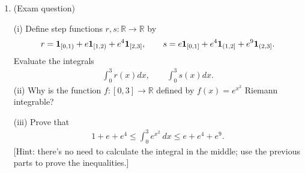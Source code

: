 \documentclass[letterpaper,10pt,english]{jupyterBook}
\begin{document}
\label{\detokenize{Problems:id68}}\begin{enumerate}
%
\setcounter{enumi}{67}
\item {} 
\sphinxAtStartPar
(Exam question)

\sphinxAtStartPar
(i) Define step functions \(r,s\colon \mathbb{R} \rightarrow \mathbb{R}\) by
\begin{equation*}
\begin{split}
    r = {\bf{1}}_{[0,1)} + e {\bf{1}}_{[1,2)} + e^4 {\bf{1}}_{[2,3]}, \qquad  s = e {\bf{1}}_{[0,1]} + e^4 {\bf{1}}_{(1,2]} + e^9 {\bf{1}}_{(2,3]}.
    \end{split}
\end{equation*}
\sphinxAtStartPar
Evaluate the integrals
\begin{equation*}
\begin{split}
    \int_0^3 r(x)dx, \qquad \int_0^3 s(x)dx.
    \end{split}
\end{equation*}
\sphinxAtStartPar
(ii) Why is the function \(f\colon [0,3]\rightarrow \mathbb{R}\) defined by \(f(x)=e^{x^2}\) Riemann integrable?

\sphinxAtStartPar
(iii) Prove that
\begin{equation*}
\begin{split}
    1+e+e^4 \leq \int_0^3 e^{x^2}\ dx \leq e+e^4+e^9.
    \end{split}
\end{equation*}
\sphinxAtStartPar
{[}Hint: there’s no need to calculate the integral in the middle; use the previous parts to prove the inequalities.{]}

\end{enumerate}
\end{document}
